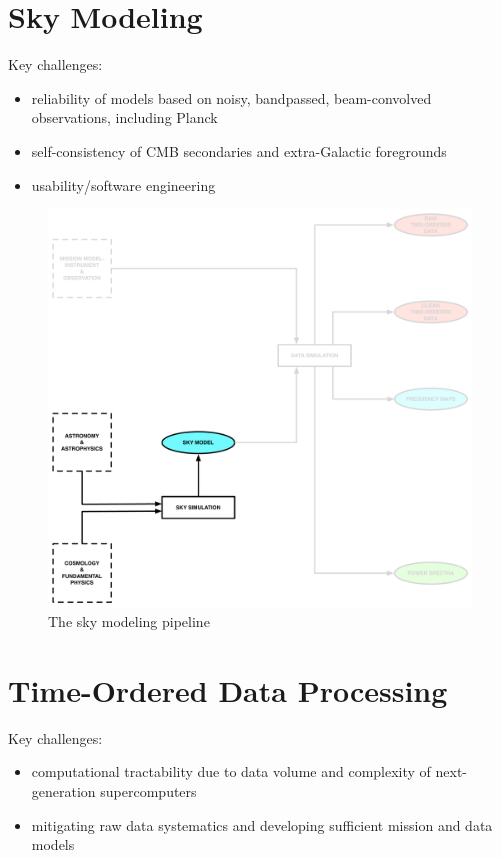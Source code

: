 \newpage

\section{Sky Modeling}

Key challenges: 
\begin{itemize} 
\item reliability of models based on noisy, bandpassed, beam-convolved observations, including Planck
\item self-consistency of CMB secondaries and extra-Galactic foregrounds
\item usability/software engineering
\end{itemize} 

\begin{figure}[htbp]
\centering
\includegraphics[width=1\textwidth]{sm}
\caption{The sky modeling pipeline}
\label{default}

\end{figure}

\newpage

\section{Time-Ordered Data Processing}

Key challenges:
\begin{itemize}
\item computational tractability due to data volume and complexity of next-generation supercomputers
\item mitigating raw data systematics and developing sufficient mission and data models
\end{itemize}

